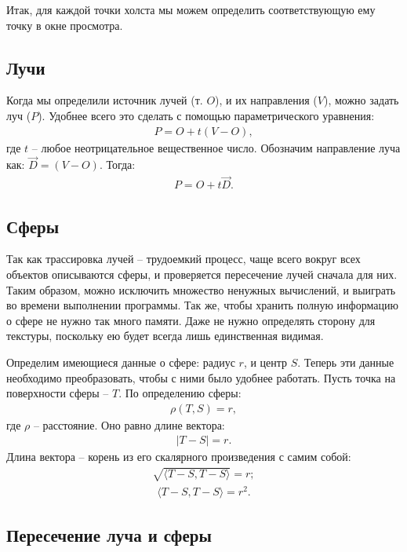 Итак, для каждой точки холста мы можем определить соответствующую ему точку в окне просмотра.

\subsection{Лучи}

Когда мы определили источник лучей (т. $O$), и их направления ($V$), можно задать луч ($P$). Удобнее всего это сделать с помощью параметрического уравнения:
\begin{gather}
	P = O+t(V-O),
\end{gather}
где $t$ – любое неотрицательное вещественное число. Обозначим направление луча как: $\vec{D}=(V-O)$. Тогда:
\begin{gather}
	P = O+t\vec{D}.
\end{gather}

\subsection{Сферы}

Так как трассировка лучей – трудоемкий процесс, чаще всего вокруг всех
объектов описываются сферы, и проверяется пересечение лучей сначала для них. Таким образом, можно исключить множество ненужных вычислений, и выиграть во времени выполнении программы. Так же, чтобы хранить полную информацию о сфере не нужно так много памяти. Даже не нужно определять сторону для текстуры, поскольку ею будет всегда лишь единственная видимая.

Определим имеющиеся данные о сфере: радиус $r$, и центр $S$. Теперь эти данные необходимо преобразовать, чтобы с ними было удобнее работать.
Пусть точка на поверхности сферы -- $T$. По определению сферы:
\begin{gather}
	\rho(T, S) = r,
\end{gather}
где $\rho$ – расстояние. Оно равно длине вектора:
\begin{gather}
	|T-S| = r.
\end{gather}
Длина вектора – корень из его скалярного произведения с самим собой:
\begin{gather}
	\sqrt{\langle T-S, T-S \rangle} = r;
\end{gather}
\begin{gather}
	\langle T-S, T-S \rangle = r^2.
\end{gather}

\subsection{Пересечение луча и сферы}

